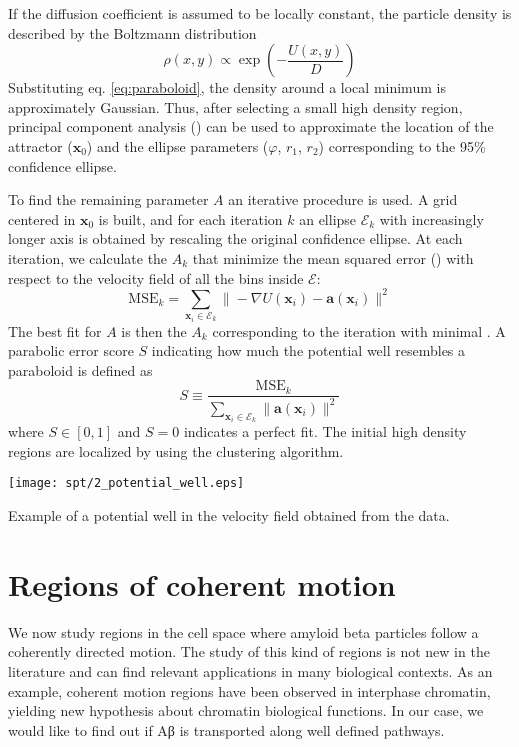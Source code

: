 If the diffusion coefficient is assumed to be locally constant, the particle density is described by the Boltzmann distribution
\begin{equation}
 \rho(x, y) \propto \exp\left(-\frac{U(x, y)}{D}\right)
\end{equation}
Substituting eq. \ref{eq:paraboloid}, the density around a local minimum is approximately Gaussian. Thus, after selecting a small high density region, principal component analysis () can be used to approximate the location of the attractor ($\bm{x}_0$) and the ellipse parameters ($\varphi$, $r_1$, $r_2$) corresponding to the 95\% confidence ellipse.

To find the remaining parameter $A$ an iterative procedure is used. A grid centered in $\bm{x}_0$ is built, and for each iteration $k$ an ellipse $\mathcal{E}_k$ with increasingly longer axis is obtained by rescaling the original confidence ellipse. At each iteration, we calculate the $A_k$ that minimize the mean squared error () with respect to the velocity field of all the bins inside $\mathcal{E}$:
\begin{equation}
 \mathrm{MSE}_k = \sum_{\bm{x}_i \in \mathcal{E}_k} \| -\nabla U(\bm{x}_i) - \bm{a}(\bm{x}_i) \|^2
\end{equation}
The best fit for $A$ is then the $A_k$ corresponding to the iteration with minimal .
A parabolic error score $S$ indicating how much the potential well resembles a paraboloid is defined as
\begin{equation}
 S \equiv \frac{\mathrm{MSE}_k}{\sum_{\bm{x}_i \in \mathcal{E}_k} \|\bm{a}(\bm{x}_i)\|^2}
\end{equation}
where $S \in [0, 1]$ and $S = 0$ indicates a perfect fit.
The initial high density regions are localized by using the  clustering algorithm.

\begin{marginfigure}
  \texttt{[image: spt/2\_potential\_well.eps]}
  \caption{Example of a potential well in the velocity field obtained from the  data.}\label{fig:well}
\end{marginfigure}


\section{Regions of coherent motion}\label{sec:pathways}

We now study regions in the cell space where amyloid beta particles follow a coherently directed motion. The study of this kind of regions is not new in the literature and can find relevant applications in many biological contexts. As an example, coherent motion regions have been observed in interphase chromatin, yielding new hypothesis about chromatin biological functions. In our case, we would like to find out if Aβ is transported along well defined pathways.

